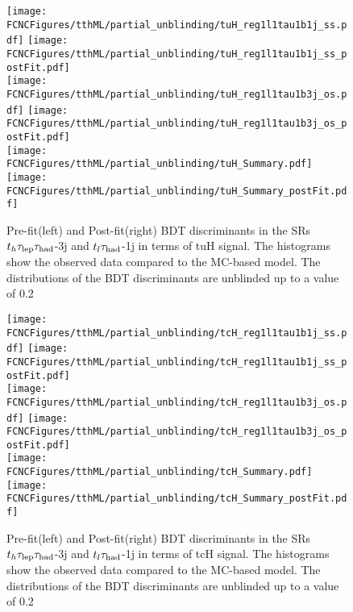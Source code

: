 \begin{figure}[H]
\centering
\texttt{[image: \\FCNCFigures/tthML/partial\_unblinding/tuH\_reg1l1tau1b1j\_ss.pdf]}
\texttt{[image: \\FCNCFigures/tthML/partial\_unblinding/tuH\_reg1l1tau1b1j\_ss\_postFit.pdf]}
\\
\texttt{[image: \\FCNCFigures/tthML/partial\_unblinding/tuH\_reg1l1tau1b3j\_os.pdf]}
\texttt{[image: \\FCNCFigures/tthML/partial\_unblinding/tuH\_reg1l1tau1b3j\_os\_postFit.pdf]}
\\
\texttt{[image: \\FCNCFigures/tthML/partial\_unblinding/tuH\_Summary.pdf]}
\texttt{[image: \\FCNCFigures/tthML/partial\_unblinding/tuH\_Summary\_postFit.pdf]}
\caption{Pre-fit(left) and Post-fit(right) BDT discriminants in the SRs $t_h\tau_\text{lep}{}\tau_\text{had}$-3j and $t_l\tau_\text{had}$-1j in terms of tuH signal. The histograms show the observed data compared to the MC-based model. The distributions of the BDT discriminants are unblinded up to a value of 0.2}
\label{fig:tthML_partial_unblinding_tuH}
\end{figure}

\begin{figure}[H]
\centering
\texttt{[image: \\FCNCFigures/tthML/partial\_unblinding/tcH\_reg1l1tau1b1j\_ss.pdf]}
\texttt{[image: \\FCNCFigures/tthML/partial\_unblinding/tcH\_reg1l1tau1b1j\_ss\_postFit.pdf]}
\\
\texttt{[image: \\FCNCFigures/tthML/partial\_unblinding/tcH\_reg1l1tau1b3j\_os.pdf]}
\texttt{[image: \\FCNCFigures/tthML/partial\_unblinding/tcH\_reg1l1tau1b3j\_os\_postFit.pdf]}
\\
\texttt{[image: \\FCNCFigures/tthML/partial\_unblinding/tcH\_Summary.pdf]}
\texttt{[image: \\FCNCFigures/tthML/partial\_unblinding/tcH\_Summary\_postFit.pdf]}
\caption{Pre-fit(left) and Post-fit(right) BDT discriminants in the SRs $t_h\tau_\text{lep}{}\tau_\text{had}$-3j and $t_l\tau_\text{had}$-1j in terms of tcH signal. The histograms show the observed data compared to the MC-based model. The distributions of the BDT discriminants are unblinded up to a value of 0.2}
\label{fig:tthML_partial_unblinding_tcH}
\end{figure}


\newpage
